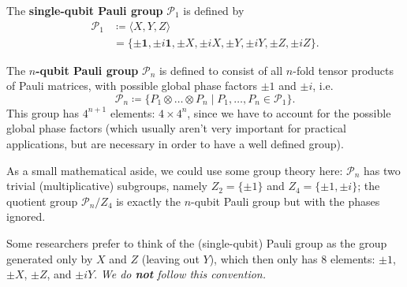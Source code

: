\documentclass[fleqn,a4paper]{article}
\newenvironment{idea}{\everypar{\setlength{\parindent}{1.5em}}}{}
\theoremstyle{definition}
\theoremstyle{definition}
\theoremstyle{definition}
\theoremstyle{definition}
\theoremstyle{remark}
\begin{document}
\begin{idea}
The \textbf{single-qubit Pauli group} \(\mathcal{P}_1\) is defined by
\[
  \begin{aligned}
    \mathcal{P}_1
    &\coloneqq \langle X,Y,Z\rangle
  \\&= \{\pm\mathbf{1}, \pm i\mathbf{1}, \pm X, \pm iX, \pm Y, \pm iY, \pm Z, \pm iZ\}.
  \end{aligned}
\]

The \textbf{\(n\)-qubit Pauli group} \(\mathcal{P}_n\) is defined to consist of all \(n\)-fold tensor products of Pauli matrices, with possible global phase factors \(\pm1\) and \(\pm i\), i.e.
\[
  \mathcal{P}_n
  \coloneqq \{P_1\otimes\ldots\otimes P_n \mid P_1,\ldots,P_n\in\mathcal{P}_1\}.
\]
This group has \(4^{n+1}\) elements: \(4\times4^n\), since we have to account for the possible global phase factors (which usually aren't very important for practical applications, but are necessary in order to have a well defined group).

\end{idea}

As a small mathematical aside, we could use some group theory here: \(\mathcal{P}_n\) has two trivial (multiplicative) subgroups, namely \(Z_2=\{\pm1\}\) and \(Z_4=\{\pm1,\pm i\}\); the quotient group \(\mathcal{P}_n/Z_4\) is exactly the \(n\)-qubit Pauli group but with the phases ignored.

Some researchers prefer to think of the (single-qubit) Pauli group as the group generated only by \(X\) and \(Z\) (leaving out \(Y\)), which then only has 8 elements: \(\pm1\), \(\pm X\), \(\pm Z\), and \(\pm iY\).
\emph{We do \textbf{not} follow this convention.}
\end{document}
